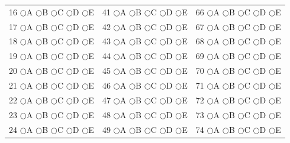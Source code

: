 \documentclass[12pt]{article}
\begin{document}
\begin{titlepage}
\begin{center}
\begin{tabular}{ccc}
16 \quad $\bigcirc$A $\bigcirc$B $\bigcirc$C $\bigcirc$D $\bigcirc$E &
41 \quad $\bigcirc$A $\bigcirc$B $\bigcirc$C $\bigcirc$D $\bigcirc$E &
66 \quad $\bigcirc$A $\bigcirc$B $\bigcirc$C $\bigcirc$D $\bigcirc$E \\

17 \quad $\bigcirc$A $\bigcirc$B $\bigcirc$C $\bigcirc$D $\bigcirc$E &
42 \quad $\bigcirc$A $\bigcirc$B $\bigcirc$C $\bigcirc$D $\bigcirc$E &
67 \quad $\bigcirc$A $\bigcirc$B $\bigcirc$C $\bigcirc$D $\bigcirc$E \\

18 \quad $\bigcirc$A $\bigcirc$B $\bigcirc$C $\bigcirc$D $\bigcirc$E &
43 \quad $\bigcirc$A $\bigcirc$B $\bigcirc$C $\bigcirc$D $\bigcirc$E &
68 \quad $\bigcirc$A $\bigcirc$B $\bigcirc$C $\bigcirc$D $\bigcirc$E \\

19 \quad $\bigcirc$A $\bigcirc$B $\bigcirc$C $\bigcirc$D $\bigcirc$E &
44 \quad $\bigcirc$A $\bigcirc$B $\bigcirc$C $\bigcirc$D $\bigcirc$E &
69 \quad $\bigcirc$A $\bigcirc$B $\bigcirc$C $\bigcirc$D $\bigcirc$E \\

20 \quad $\bigcirc$A $\bigcirc$B $\bigcirc$C $\bigcirc$D $\bigcirc$E &
45 \quad $\bigcirc$A $\bigcirc$B $\bigcirc$C $\bigcirc$D $\bigcirc$E &
70 \quad $\bigcirc$A $\bigcirc$B $\bigcirc$C $\bigcirc$D $\bigcirc$E \\

21 \quad $\bigcirc$A $\bigcirc$B $\bigcirc$C $\bigcirc$D $\bigcirc$E &
46 \quad $\bigcirc$A $\bigcirc$B $\bigcirc$C $\bigcirc$D $\bigcirc$E &
71 \quad $\bigcirc$A $\bigcirc$B $\bigcirc$C $\bigcirc$D $\bigcirc$E \\

22 \quad $\bigcirc$A $\bigcirc$B $\bigcirc$C $\bigcirc$D $\bigcirc$E &
47 \quad $\bigcirc$A $\bigcirc$B $\bigcirc$C $\bigcirc$D $\bigcirc$E &
72 \quad $\bigcirc$A $\bigcirc$B $\bigcirc$C $\bigcirc$D $\bigcirc$E \\

23 \quad $\bigcirc$A $\bigcirc$B $\bigcirc$C $\bigcirc$D $\bigcirc$E &
48 \quad $\bigcirc$A $\bigcirc$B $\bigcirc$C $\bigcirc$D $\bigcirc$E &
73 \quad $\bigcirc$A $\bigcirc$B $\bigcirc$C $\bigcirc$D $\bigcirc$E \\

24 \quad $\bigcirc$A $\bigcirc$B $\bigcirc$C $\bigcirc$D $\bigcirc$E &
49 \quad $\bigcirc$A $\bigcirc$B $\bigcirc$C $\bigcirc$D $\bigcirc$E &
74 \quad $\bigcirc$A $\bigcirc$B $\bigcirc$C $\bigcirc$D $\bigcirc$E \\


\end{tabular}
\end{center}
\end{titlepage}
\end{document}
